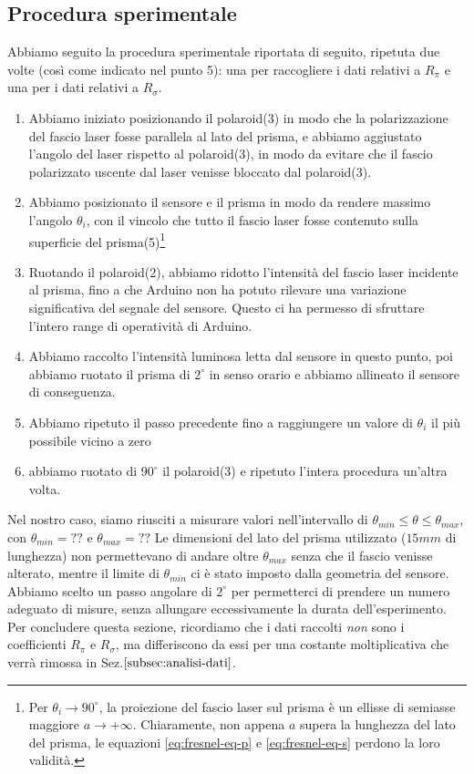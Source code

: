 \subsection{Procedura sperimentale}\label{subsec:procedura-sperimentale}
  Abbiamo seguito la procedura sperimentale riportata di seguito, ripetuta due
  volte (così come indicato nel punto 5): una per raccogliere i dati relativi a $R_\pi$ e una per i dati relativi
  a $R_\sigma$.
  \begin{enumerate}
    \item%
      Abbiamo iniziato posizionando il polaroid(3) in modo che la polarizzazione del
      fascio laser fosse parallela al lato del prisma, e abbiamo aggiustato l'angolo
      del laser rispetto al polaroid(3), in modo da evitare che il fascio
      polarizzato uscente dal laser venisse bloccato dal polaroid(3).
    \item%
      Abbiamo posizionato il sensore e il prisma in modo da rendere
      massimo l'angolo $\theta_i$, con il vincolo che
      tutto il fascio laser fosse contenuto sulla superficie del prisma(5)\footnote{Per $\theta_i \to 90^\circ$, la
      proiezione del fascio laser sul prisma è un ellisse di semiasse maggiore $a \to +\infty$. Chiaramente, non appena
      $a$ supera la lunghezza del lato del prisma, le equazioni \eqref{eq:fresnel-eq-p} e \eqref{eq:fresnel-eq-s} perdono
      la loro validità.}
    \item%
      Ruotando il polaroid(2), abbiamo ridotto l’intensità del fascio laser
      incidente al prisma, fino a che Arduino non ha potuto rilevare una
      variazione significativa del segnale del sensore.
      Questo ci ha permesso di sfruttare l'intero range di operatività di Arduino.
    \item%
      Abbiamo raccolto l'intensità luminosa letta dal sensore in questo punto,
      poi abbiamo ruotato il prisma di $2^\circ$ in senso orario e abbiamo
      allineato il sensore di conseguenza.
    \item%
      Abbiamo ripetuto il passo precedente fino a raggiungere un valore di $\theta_i$
      il più possibile vicino a zero
    \item%
      abbiamo ruotato di $90^\circ$ il polaroid(3) e ripetuto l'intera
      procedura un'altra volta.
  \end{enumerate}

  Nel nostro caso, siamo riusciti a misurare valori nell'intervallo di ${\theta_{min} \leq \theta \leq \theta_{max}}$,
  con ${\theta_{min}=??}$ e ${\theta_{max}=??}$ %
  Le dimensioni del lato del prisma utilizzato ($15mm$ di lunghezza) non permettevano
  di andare oltre $\theta_{max}$ senza che il fascio venisse alterato, mentre il
  limite di $\theta_{min}$ ci è stato imposto dalla geometria del sensore.
  Abbiamo scelto un passo angolare di $2^\circ$ per permetterci di prendere un
  numero adeguato di misure, senza allungare eccessivamente la durata dell'esperimento.
  Per concludere questa sezione, ricordiamo che i dati raccolti \emph{non} sono
  i coefficienti $R_\pi$ e $R_\sigma$, ma differiscono da essi per una costante
  moltiplicativa che verrà rimossa in Sez.$\ref{subsec:analisi-dati}$.
\endinput

